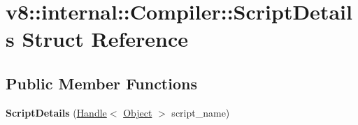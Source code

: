 \hypertarget{structv8_1_1internal_1_1Compiler_1_1ScriptDetails}{}\section{v8\+:\+:internal\+:\+:Compiler\+:\+:Script\+Details Struct Reference}
\label{structv8_1_1internal_1_1Compiler_1_1ScriptDetails}
\subsection*{Public Member Functions}
\begin{DoxyCompactItemize}
\item 
\mbox{\label{structv8_1_1internal_1_1Compiler_1_1ScriptDetails_aa273e148770d595932d892a2e9769e98}} 
{\bfseries Script\+Details} (\mbox{\hyperlink{classv8_1_1internal_1_1Handle}{Handle}}$<$ \mbox{\hyperlink{classv8_1_1internal_1_1Object}{Object}} $>$ script\+\_\+name)
\end{DoxyCompactItemize}
